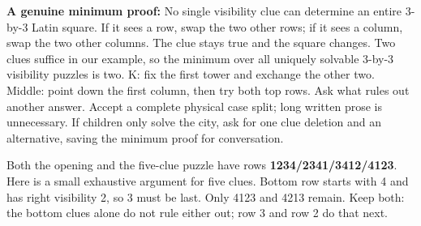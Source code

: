 \documentclass[11pt]{article}
\begin{document}
\textbf{A genuine minimum proof:} No single visibility clue can determine an entire 3-by-3 Latin square. If it sees a row, swap the two other rows; if it sees a column, swap the two other columns. The clue stays true and the square changes. Two clues suffice in our example, so the minimum over all uniquely solvable 3-by-3 visibility puzzles is two.
K: fix the first tower and exchange the other two. Middle: point down the first column, then try both top rows. Ask what rules out another answer. Accept a complete physical case split; long written prose is unnecessary. If children only solve the city, ask for one clue deletion and an alternative, saving the minimum proof for conversation.

\newpage
{}
Both the opening and the five-clue puzzle have rows \textbf{1234/2341/3412/4123}. Here is a small exhaustive argument for five clues. Bottom row starts with 4 and has right visibility 2, so 3 must be last. Only 4123 and 4213 remain. Keep both: the bottom clues alone do not rule either out; row 3 and row 2 do that next.
\end{document}
